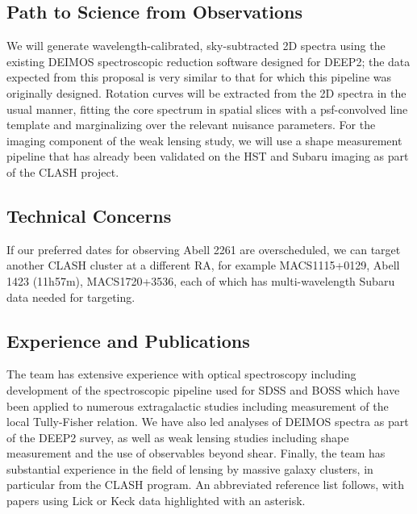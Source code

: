 \documentclass[12pt]{article}
\begin{document}
\subsection{Path to Science from Observations}
We will generate wavelength-calibrated, sky-subtracted 2D spectra using the existing DEIMOS spectroscopic reduction software designed for DEEP2; the data expected from this proposal is very similar to that for which this pipeline was originally designed. Rotation curves will be extracted from the 2D spectra in the usual manner, fitting the core spectrum in spatial slices with a psf-convolved line template and marginalizing over the relevant nuisance parameters. For the imaging component of the weak lensing study, we will use a shape measurement pipeline that has already been validated on the HST and Subaru imaging as part of the CLASH project.

\subsection{Technical Concerns}
If our preferred dates for observing Abell 2261 are overscheduled, we can target another CLASH cluster at a different RA, for example MACS1115+0129, Abell 1423 (11h57m), MACS1720+3536, each of which has multi-wavelength Subaru data needed for targeting.

\subsection{Experience and Publications}
The team has extensive experience with optical spectroscopy including development of the spectroscopic pipeline used for SDSS and BOSS which have been applied to numerous extragalactic studies including measurement of the local Tully-Fisher relation. We have also led analyses of DEIMOS spectra as part of the DEEP2 survey, as well as weak lensing studies including shape measurement and the use of observables beyond shear. Finally, the team has substantial experience in the field of lensing by massive galaxy clusters, in particular from the CLASH program. An abbreviated reference list follows, with papers using Lick or Keck data highlighted with an asterisk.
\end{document}
